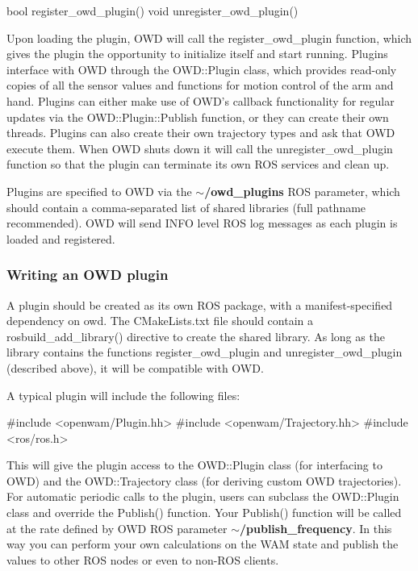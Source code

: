 \begin{DoxyVerb}bool register_owd_plugin()
void unregister_owd_plugin()
\end{DoxyVerb}


Upon loading the plugin, O\-W\-D will call the register\-\_\-owd\-\_\-plugin function, which gives the plugin the opportunity to initialize itself and start running. Plugins interface with O\-W\-D through the O\-W\-D\-::\-Plugin class, which provides read-\/only copies of all the sensor values and functions for motion control of the arm and hand. Plugins can either make use of O\-W\-D's callback functionality for regular updates via the O\-W\-D\-::\-Plugin\-::\-Publish function, or they can create their own threads. Plugins can also create their own trajectory types and ask that O\-W\-D execute them. When O\-W\-D shuts down it will call the unregister\-\_\-owd\-\_\-plugin function so that the plugin can terminate its own R\-O\-S services and clean up.

Plugins are specified to O\-W\-D via the {\bfseries $\sim$/owd\-\_\-plugins} R\-O\-S parameter, which should contain a comma-\/separated list of shared libraries (full pathname recommended). O\-W\-D will send I\-N\-F\-O level R\-O\-S log messages as each plugin is loaded and registered.\hypertarget{plugins_plugin_writing}{}\subsubsection{Writing an O\-W\-D plugin}\label{plugins_plugin_writing}
A plugin should be created as its own R\-O\-S package, with a manifest-\/specified dependency on owd. The C\-Make\-Lists.\-txt file should contain a rosbuild\-\_\-add\-\_\-library() directive to create the shared library. As long as the library contains the functions register\-\_\-owd\-\_\-plugin and unregister\-\_\-owd\-\_\-plugin (described above), it will be compatible with O\-W\-D.

A typical plugin will include the following files\-:

\begin{DoxyVerb}#include <openwam/Plugin.hh>
#include <openwam/Trajectory.hh>
#include <ros/ros.h>
\end{DoxyVerb}


This will give the plugin access to the O\-W\-D\-::\-Plugin class (for interfacing to O\-W\-D) and the O\-W\-D\-::\-Trajectory class (for deriving custom O\-W\-D trajectories). For automatic periodic calls to the plugin, users can subclass the O\-W\-D\-::\-Plugin class and override the Publish() function. Your Publish() function will be called at the rate defined by O\-W\-D R\-O\-S parameter {\bfseries $\sim$/publish\-\_\-frequency}. In this way you can perform your own calculations on the W\-A\-M state and publish the values to other R\-O\-S nodes or even to non-\/\-R\-O\-S clients.

